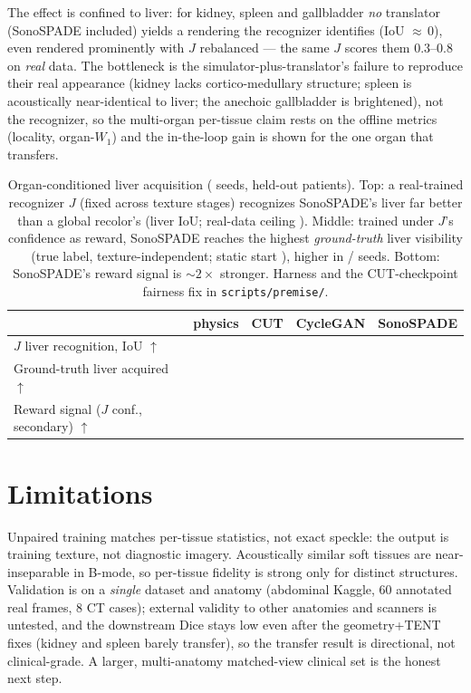 \documentclass[runningheads]{llncs}
\begin{document}
The effect is confined to liver: for kidney, spleen and gallbladder \emph{no} translator (SonoSPADE
included) yields a rendering the recognizer identifies (IoU ${\approx}\,0$), even rendered prominently
with $J$ rebalanced --- the same $J$ scores them $0.3$--$0.8$ on \emph{real} data. The bottleneck is the
simulator-plus-translator's failure to reproduce their real appearance (kidney lacks cortico-medullary
structure; spleen is acoustically near-identical to liver; the anechoic gallbladder is brightened), not
the recognizer, so the multi-organ per-tissue claim rests on the offline metrics (locality, organ-$W_1$)
and the in-the-loop gain is shown for the one organ that transfers.

\begin{table}[t]
\centering
\caption{Organ-conditioned liver acquisition (\rlSeeds{} seeds, held-out patients). Top: a real-trained
recognizer $J$ (fixed across texture stages) recognizes SonoSPADE's liver far better than a global
recolor's (liver IoU; real-data ceiling \recCeil{}). Middle: trained under $J$'s confidence as reward,
SonoSPADE reaches the highest \emph{ground-truth} liver visibility (true label, texture-independent;
static start \rlStart{}), higher in \rlSeeds{}/\rlSeeds{} seeds. Bottom: SonoSPADE's reward signal is
${\sim}2\times$ stronger. Harness and the CUT-checkpoint fairness fix in \texttt{scripts/premise/}.}
\label{tab:organrl}
\begin{tabular}{lcccc}
\toprule
 & physics & CUT & CycleGAN & SonoSPADE\\
\midrule
$J$ liver recognition, IoU $\uparrow$        & \recPhys{} & \recCut{} & \recCyc{} & \textbf{\recSono{}}\\
Ground-truth liver acquired $\uparrow$       & \rlPhys{}  & \rlCut{}  & \rlCyc{}  & \textbf{\rlSono{}}\\
Reward signal ($J$ conf., secondary) $\uparrow$ & \rewPhys{} & \rewCut{} & \rewCyc{} & \textbf{\rewSono{}}\\
\bottomrule
\end{tabular}
\end{table}

\section{Limitations}
\label{sec:limitations}
Unpaired training matches per-tissue statistics, not exact speckle: the output is training texture, not
diagnostic imagery. Acoustically similar soft tissues are near-inseparable in B-mode, so per-tissue
fidelity is strong only for distinct structures. Validation is on a \emph{single} dataset and anatomy
(abdominal Kaggle, $60$ annotated real frames, $8$ CT cases); external validity to other anatomies and
scanners is untested, and the downstream Dice stays low even after the geometry+TENT fixes (kidney and
spleen barely transfer), so the transfer result is directional, not clinical-grade. A larger,
multi-anatomy matched-view clinical set is the honest next step.
\end{document}

